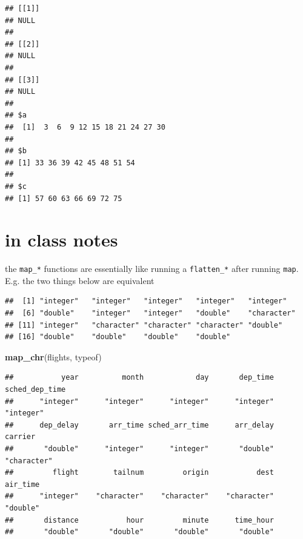 \documentclass[]{book}
\newenvironment{Shaded}{\begin{snugshade}}{\end{snugshade}}
\newcommand{\KeywordTok}[1]{\textcolor[rgb]{0.13,0.29,0.53}{\textbf{#1}}}
\newcommand{\NormalTok}[1]{#1}
\newcommand{\OperatorTok}[1]{\textcolor[rgb]{0.81,0.36,0.00}{\textbf{#1}}}
\newcommand{\StringTok}[1]{\textcolor[rgb]{0.31,0.60,0.02}{#1}}
\theoremstyle{definition}
\theoremstyle{definition}
\theoremstyle{definition}
\theoremstyle{remark}
\begin{document}
\begin{verbatim}
## [[1]]
## NULL
## 
## [[2]]
## NULL
## 
## [[3]]
## NULL
## 
## $a
##  [1]  3  6  9 12 15 18 21 24 27 30
## 
## $b
## [1] 33 36 39 42 45 48 51 54
## 
## $c
## [1] 57 60 63 66 69 72 75
\end{verbatim}

\hypertarget{in-class-notes}{%
\section{in class notes}\label{in-class-notes}}

the \texttt{map\_*} functions are essentially like running a
\texttt{flatten\_*} after running \texttt{map}. E.g. the two things
below are equivalent

\begin{Shaded}
\end{Shaded}

\begin{verbatim}
##  [1] "integer"   "integer"   "integer"   "integer"   "integer"  
##  [6] "double"    "integer"   "integer"   "double"    "character"
## [11] "integer"   "character" "character" "character" "double"   
## [16] "double"    "double"    "double"    "double"
\end{verbatim}

\begin{Shaded}
\begin{Highlighting}[]
\KeywordTok{map_chr}\NormalTok{(flights, typeof)}
\end{Highlighting}
\end{Shaded}

\begin{verbatim}
##           year          month            day       dep_time sched_dep_time 
##      "integer"      "integer"      "integer"      "integer"      "integer" 
##      dep_delay       arr_time sched_arr_time      arr_delay        carrier 
##       "double"      "integer"      "integer"       "double"    "character" 
##         flight        tailnum         origin           dest       air_time 
##      "integer"    "character"    "character"    "character"       "double" 
##       distance           hour         minute      time_hour 
##       "double"       "double"       "double"       "double"
\end{verbatim}
\end{document}
